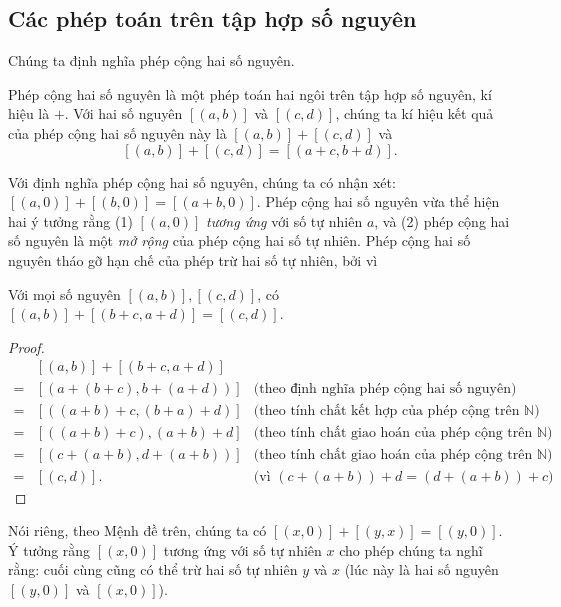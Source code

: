 \subsection*{Các phép toán trên tập hợp số nguyên}

Chúng ta định nghĩa phép cộng hai số nguyên.
\begin{definition}
	Phép cộng hai số nguyên là một phép toán hai ngôi trên tập hợp số nguyên, kí hiệu là $+$. Với hai số nguyên $[(a, b)]$ và $[(c, d)]$, chúng ta kí hiệu kết quả của phép cộng hai số nguyên này là $[(a, b)] + [(c, d)]$ và
	\[
		[(a, b)] + [(c, d)] = [(a+c, b+d)].
	\]
\end{definition}

Với định nghĩa phép cộng hai số nguyên, chúng ta có nhận xét: $[(a, 0)] + [(b, 0)] = [(a+b, 0)]$. Phép cộng hai số nguyên vừa thể hiện hai ý tưởng rằng (1) $[(a, 0)]$ \textit{tương ứng} với số tự nhiên $a$, và (2) phép cộng hai số nguyên là một \textit{mở rộng} của phép cộng hai số tự nhiên. Phép cộng hai số nguyên tháo gỡ hạn chế của phép trừ hai số tự nhiên, bởi vì

\begin{proposition}
	Với mọi số nguyên $[(a, b)], [(c, d)]$, có $[(a, b)] + [(b+c, a+d)] = [(c, d)]$.
\end{proposition}

\begin{proof}
	\begin{align*}
		  & [(a, b)] + [(b+c, a+d)]                                                                     \\
		= & [(a+(b+c), b+(a+d))]    & \text{(theo định nghĩa phép cộng hai số nguyên)}                  \\
		= & [((a+b)+c, (b+a)+d)]    & \text{(theo tính chất kết hợp của phép cộng trên $\mathbb{N}$)}   \\
		= & [((a+b)+c), (a+b)+d]    & \text{(theo tính chất giao hoán của phép cộng trên $\mathbb{N}$)} \\
		= & [(c+(a+b), d+(a+b))]    & \text{(theo tính chất giao hoán của phép cộng trên $\mathbb{N}$)} \\
		= & [(c, d)].               & \text{(vì $(c+(a+b))+d = (d+(a+b))+c$)}
	\end{align*}
\end{proof}

Nói riêng, theo Mệnh đề trên, chúng ta có $[(x, 0)] + [(y, x)] = [(y, 0)]$. Ý tưởng rằng $[(x, 0)]$ tương ứng với số tự nhiên $x$ cho phép chúng ta nghĩ rằng: cuối cùng cũng có thể trừ hai số tự nhiên $y$ và $x$ (lúc này là hai số nguyên $[(y, 0)]$ và $[(x, 0)]$).

